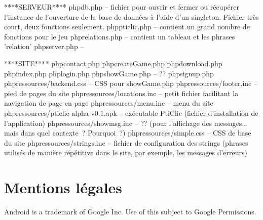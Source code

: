 \documentclass[a4paper,11pt,french]{article}
\begin{document}
****SERVEUR****
php\/db.php -- fichier pour ouvrir et fermer ou récupérer l'instance de l'ouverture de la base de données à l'aide d'un singleton. 
		Fichier très court, deux fonctions seulement.
php\/pticlic.php -- contient un grand nombre de fonctions pour le jeu
php\/relations.php -- contient un tableau et les phrases 'relation'
php\/server.php --



****SITE****
php\/contact.php
php\/createGame.php
php\/download.php
php\/index.php
php\/login.php
php\/showGame.php -- ??
php\/signup.php
php\/ressources/backend.css  -- CSS pour showGame.php
php\/ressources/footer.inc  -- pied de pages du site
php\/ressources/locations.inc  -- petit fichier facilitant la navigation de page en page
php\/ressources/menu.inc  -- menu du site
php\/ressources/pticlic-alpha-v0.1.apk  -- exécutable PtiClic (fichier d'installation de l'application)
php\/ressources/showmsg.inc  -- ?? (pour l'affichage des messages... mais dans quel contexte~? Pourquoi~?)
php\/ressources/simple.css  -- CSS de base du site
php\/ressources/strings.inc -- fichier de configuration des strings (phrases utilisés de manière répétitive dans le site, par exemple, les messages d'erreurs)

\section{Mentions légales}
Android is a trademark of Google Inc. Use of this subject to Google Permissions.
\end{document}
